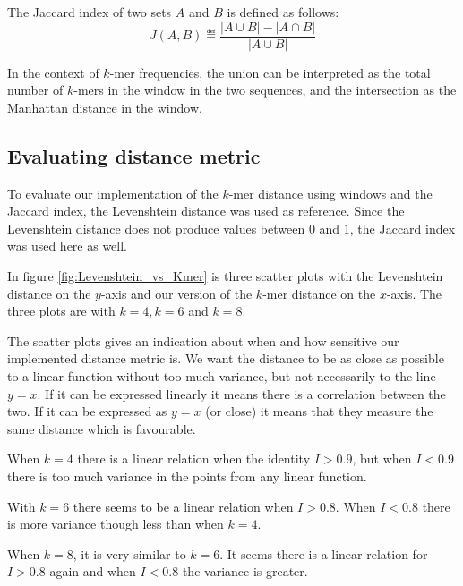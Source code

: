 The Jaccard index of two sets $A$ and $B$ is defined as follows:
\begin{equation}
  J(A, B) \eqdef \frac{|A \cup B| - |A \cap B|}{|A \cup B|}
\end{equation}

In the context of $k$-mer frequencies, the union can be interpreted as the
total number of $k$-mers in the window in the two sequences, and the
intersection as the Manhattan distance in the window.


\subsection{Evaluating distance metric}

To evaluate our implementation of the $k$-mer distance using windows and the
Jaccard index, the Levenshtein distance was used as reference. Since the
Levenshtein distance does not produce values between $0$ and $1$, the Jaccard
index was used here as well.

In figure \ref{fig:Levenshtein_vs_Kmer} is three scatter plots with the
Levenshtein distance on the $y$-axis and our version of the $k$-mer distance on
the $x$-axis. The three plots are with $k=4, k=6$ and $k=8$.

The scatter plots gives an indication about when and how sensitive our
implemented distance metric is. We want the distance to be as close as possible
to a linear function without too much variance, but not necessarily to the line
$y=x$. If it can be expressed linearly it means there is a correlation between
the two. If it can be expressed as $y=x$ (or close) it means that they measure
the same distance which is favourable.

When $k=4$ there is a linear relation when the identity $I>0.9$, but when
$I<0.9$ there is too much variance in the points from any linear function.

With $k=6$ there seems to be a linear relation when $I>0.8$. When $I<0.8$ there
is more variance though less than when $k=4$.

When $k=8$, it is very similar to $k=6$. It seems there is a linear relation
for $I>0.8$ again and when $I<0.8$ the variance is greater.

